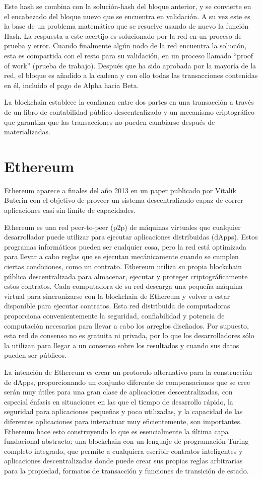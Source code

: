 Este hash se combina con la solución-hash del bloque anterior, y se convierte en el encabezado del
bloque nuevo que se encuentra en validación. A su vez este es la base de un problema matemático que
se resuelve usando de nuevo la función Hash. La respuesta a este acertijo es solucionado por la red
en un proceso de prueba y error. Cuando finalmente algún nodo de la red encuentra la solución, esta
es compartida con el resto para su validación, en un proceso llamado “proof of work” (prueba de
trabajo). Después que ha sido aprobada por la mayoría de la red, el bloque es añadido a la cadena y 
con ello todas las transacciones contenidas en él, incluido el pago de Alpha hacia Beta.

La blockchain establece la confianza entre dos partes en una transacción a través de un libro de 
contabilidad público descentralizado y un mecanismo criptográfico que garantiza que las 
transacciones no pueden cambiarse después de materializadas.

\section{Ethereum}
Ethereum aparece a finales del año 2013 en un paper publicado por Vitalik Buterin con el objetivo
de proveer un sistema descentralizado capaz de correr aplicaciones casi sin límite de capacidades.

Ethereum es una red peer-to-peer (p2p) de máquinas virtuales que cualquier desarrollador puede
utilizar para ejecutar aplicaciones distribuidas (dApps). Estos programas informáticos pueden ser
cualquier cosa, pero la red está optimizada para llevar a cabo reglas que se ejecutan mecánicamente
cuando se cumplen ciertas condiciones, como un contrato. Ethereum utiliza su propia blockchain
pública descentralizada para almacenar, ejecutar y proteger criptográficamente estos contratos. 
Cada computadora de su red descarga una pequeña máquina virtual para sincronizarse con la
blockchain de Ethereum y volver a estar disponible para ejecutar contratos. Esta red distribuida de
computadoras proporciona convenientemente la seguridad, confiabilidad y potencia de computación
necesarias para llevar a cabo los arreglos diseñados. Por supuesto, esta red de consenso no es
gratuita ni privada, por lo que los desarrolladores sólo la utilizan para llegar a un consenso
sobre los resultados y cuando sus datos pueden ser públicos.

La intención de Ethereum es crear un protocolo alternativo para la construcción de dApps,
proporcionando un conjunto diferente de compensaciones que se cree serán muy útiles para una gran
clase de aplicaciones descentralizadas, con especial énfasis en situaciones en las que el tiempo de
desarrollo rápido, la seguridad para aplicaciones pequeñas y poco utilizadas, y la capacidad de las
 diferentes aplicaciones para interactuar muy eficientemente, son importantes.
Ethereum hace esto construyendo lo que es esencialmente la última capa fundacional abstracta: una
blockchain con un lenguaje de programación Turing completo integrado, que permite a cualquiera
escribir contratos inteligentes y aplicaciones descentralizadas donde puede crear sus propias
reglas arbitrarias para la propiedad, formatos de transacción y funciones de transición de estado.


